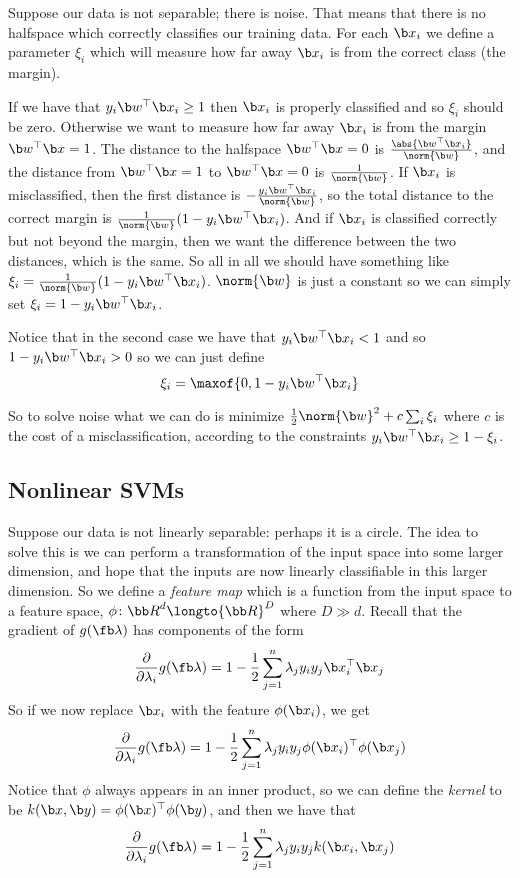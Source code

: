 Suppose our data is not separable; there is noise.
That means that there is no halfspace which correctly classifies our training data.
For each $\b x_i$ we define a parameter $\xi_i$ which will measure how far away $\b x_i$ is from the correct class (the margin).

If we have that $y_i\b w^\top\b x_i\geq1$ then $\b x_i$ is properly classified and so $\xi_i$ should be zero.
Otherwise we want to measure how far away $\b x_i$ is from the margin $\b w^\top\b x=1$.
The distance to the halfspace $\b w^\top\b x=0$ is $\frac{\abs{\b w^\top\b x_i}}{\norm{\b w}}$, and the distance from $\b w^\top\b x=1$ to $\b w^\top\b x=0$ is $\frac1{\norm{\b w}}$.
If $\b x_i$ is misclassified, then the first distance is $-\frac{y_i\b w^\top\b x_i}{\norm{\b w}}$, so the total distance to the correct margin is $\frac1{\norm{\b w}}(1-y_i\b w^\top\b x_i)$.
And if $\b x_i$ is classified correctly but not beyond the margin, then we want the difference between the two distances, which is the same.
So all in all we should have something like $\xi_i=\frac1{\norm{\b w}}(1-y_i\b w^\top\b x_i)$.
$\norm{\b w}$ is just a constant so we can simply set $\xi_i=1-y_i\b w^\top\b x_i$.

Notice that in the second case we have that $y_i\b w^\top\b x_i<1$ and so $1-y_i\b w^\top\b x_i>0$ so we can just define
$$ \xi_i = \maxof{0,1-y_i\b w^\top\b x_i} $$

So to solve noise what we can do is minimize $\frac12\norm{\b w}^2+c\sum_i\xi_i$ where $c$ is the cost of a misclassification, according to the constraints $y_i\b w^\top\b x_i\geq1-\xi_i$.

\subsection{Nonlinear SVMs}

Suppose our data is not linearly separable: perhaps it is a circle.
The idea to solve this is we can perform a transformation of the input space into some larger dimension, and hope that the inputs are now linearly classifiable in this larger dimension.
So we define a {\it feature map} which is a function from the input space to a feature space, $\phi\colon{\bb R}^d\longto{\bb R}^D$ where $D\gg d$.
Recall that the gradient of $g(\fb\lambda)$ has components of the form
$$ \frac\partial{\partial\lambda_i}g(\fb\lambda) = 1 - \frac12\sum_{j=1}^n\lambda_jy_iy_j\b x_i^\top\b x_j $$
So if we now replace $\b x_i$ with the feature $\phi(\b x_i)$, we get
$$ \frac\partial{\partial\lambda_i}g(\fb\lambda) = 1 - \frac12\sum_{j=1}^n\lambda_jy_iy_j\phi(\b x_i)^\top\phi(\b x_j) $$
Notice that $\phi$ always appears in an inner product, so we can define the {\it kernel} to be $k(\b x,\b y)=\phi(\b x)^\top\phi(\b y)$, and then we have that
$$ \frac\partial{\partial\lambda_i}g(\fb\lambda) = 1 - \frac12\sum_{j=1}^n\lambda_jy_iy_jk(\b x_i,\b x_j) $$

